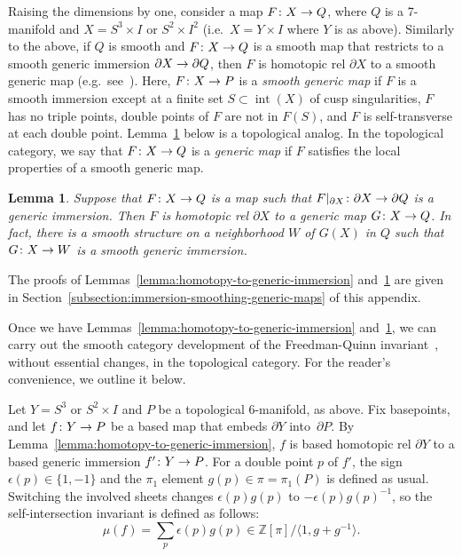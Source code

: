 \documentclass[11pt]{amsart}
\def\to{\mathchoice{\longrightarrow}{\rightarrow}{\rightarrow}{\rightarrow}}
\newtheorem{lemma}[theorem]{Lemma}
\theoremstyle{definition}
\theoremstyle{theorem-giventitle}
\theoremstyle{definition-giventitle}
\numberwithin{equation}{section}
\def\Z{\mathbb{Z}}
\def\inte{\operatorname{int}}
\begin{document}
Raising the dimensions by one, consider a map $F\colon X \to Q$, where $Q$ is a 7-manifold and $X=S^3\times I$ or $S^2\times I^2$ (i.e.\ $X=Y\times I$ where $Y$ is as above).
Similarly to the above, if $Q$ is smooth and $F\colon X\to Q$ is a smooth map that restricts to a smooth generic immersion $\partial X \to \partial Q$, then $F$ is homotopic rel $\partial X$ to a smooth generic map (e.g.\ see~\cite[Theorem~2.5]{Haefliger:1961-1}).
Here, $F\colon X\to P$ is a \emph{smooth generic map} if $F$ is a smooth immersion except at a finite set $S\subset \inte(X)$ of cusp singularities, $F$ has no triple points, double points of $F$ are not in $F(S)$, and $F$ is self-transverse at each double point.
Lemma~\ref{lemma:homotopy-to-generic-map} below is a topological analog.
In the topological category, we say that $F\colon X\to Q$ is a \emph{generic map} if $F$ satisfies the local properties of a smooth generic map.

\begin{lemma}
  \label{lemma:homotopy-to-generic-map}
  Suppose that $F\colon X \to Q$ is a map such that $F|_{\partial X}\colon \partial X \to \partial Q$ is a generic immersion.
  Then $F$ is homotopic rel $\partial X$ to a generic map $G\colon X\to Q$.
  In fact, there is a smooth structure on a neighborhood $W$ of $G(X)$ in $Q$ such that $G\colon X\to W$ is a smooth generic immersion.
\end{lemma}

The proofs of Lemmas~\ref{lemma:homotopy-to-generic-immersion} and~\ref{lemma:homotopy-to-generic-map} are given in Section~\ref{subsection:immersion-smoothing-generic-maps} of this appendix.

Once we have Lemmas~\ref{lemma:homotopy-to-generic-immersion} and~\ref{lemma:homotopy-to-generic-map}, we can carry out the smooth category development of the Freedman-Quinn invariant~\cite[Section~4]{Schneiderman-Teichner:2022-1}, without essential changes, in the topological category.
For the reader's convenience, we outline it below.

Let $Y=S^3$ or $S^2\times I$ and $P$ be a topological 6-manifold, as above.
Fix basepoints, and let $f\colon Y\to P$ be a based map that embeds $\partial Y$ into~$\partial P$.
By Lemma~\ref{lemma:homotopy-to-generic-immersion}, $f$ is based homotopic rel $\partial Y$ to a based generic immersion $f'\colon Y\to P$.
For a double point $p$ of $f'$, the sign $\epsilon(p)\in \{1,-1\}$ and the $\pi_1$ element $g(p)\in \pi=\pi_1(P)$ is defined as usual.
Switching the involved sheets changes $\epsilon(p)g(p)$ to $-\epsilon(p)g(p)^{-1}$, so the self-intersection invariant is defined as follows:
\[
  \mu(f) = \sum_p \epsilon(p)g(p) \in \Z[\pi]/\langle 1,g+g^{-1}\rangle.
\]
\end{document}
